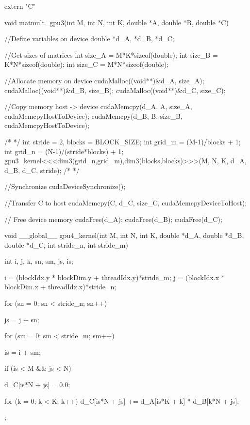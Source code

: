 extern "C" { 
void matmult_gpu3(int M, int N, int K, double *A, double *B, double *C) { 

    //Define variables on device
    double *d_A, *d_B, *d_C;

    //Get sizes of matrices
    int size_A = M*K*sizeof(double);
    int size_B = K*N*sizeof(double);
    int size_C = M*N*sizeof(double);

    //Allocate memory on device
    cudaMalloc((void**)&d_A, size_A);
    cudaMalloc((void**)&d_B, size_B);
    cudaMalloc((void**)&d_C, size_C);

    //Copy memory host -> device
    cudaMemcpy(d_A, A, size_A, cudaMemcpyHostToDevice);
    cudaMemcpy(d_B, B, size_B, cudaMemcpyHostToDevice); 

    /* */
    int stride = 2, blocks = BLOCK_SIZE;
    int grid_m = (M-1)/blocks + 1;
    int grid_n = (N-1)/(stride*blocks) + 1;
    gpu3_kernel<<<dim3(grid_n,grid_m),dim3(blocks,blocks)>>>(M, N, K, d_A, d_B, d_C, stride);
    /* */
    
    //Synchronize
    cudaDeviceSynchronize(); 
    
    //Transfer C to host
    cudaMemcpy(C, d_C, size_C, cudaMemcpyDeviceToHost);

    // Free device memory
    cudaFree(d_A);
    cudaFree(d_B);
    cudaFree(d_C);
}
}



void __global__ gpu4_kernel(int M, int N, int K, double *d_A, double *d_B, double *d_C, int stride_n, int stride_m){
    int i, j, k, sn, sm, js, is;

    i = (blockIdx.y * blockDim.y + threadIdx.y)*stride_m;
    j = (blockIdx.x * blockDim.x + threadIdx.x)*stride_n;

    for (sn = 0; sn < stride_n; sn++){
        js = j + sn;
        
        for (sm = 0; sm < stride_m; sm++){
            is = i + sm;
            
            if (is < M && js < N){
                d_C[is*N + js] = 0.0;

                for (k = 0; k < K; k++){
                    d_C[is*N + js] += d_A[is*K + k] * d_B[k*N + js];
                }
            }
        }
    }
};

